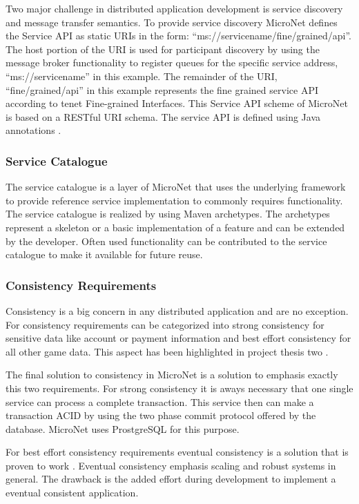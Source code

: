 Two major challenge in distributed application development is service discovery
and message transfer semantics. To provide service discovery MicroNet defines
the Service API as static URIs in the form:
``ms://servicename/fine/grained/api''. The host portion of the URI is used for
participant discovery by using the message broker functionality to register
queues for the specific service address, ``ms://servicename'' in this example.
The remainder of the URI, ``fine/grained/api'' in this example represents the
fine grained service API according to tenet Fine-grained Interfaces. This
Service API scheme of MicroNet is based on a RESTful URI schema. The service API
is defined using Java annotations .

\subsubsection{Service Catalogue}

The service catalogue is a layer of MicroNet that uses the underlying framework
to provide reference service implementation to commonly requires functionality.
The service catalogue is realized by using Maven archetypes. The archetypes
represent a skeleton or a basic implementation of a feature and can be extended
by the developer. Often used functionality can be contributed to the service
catalogue to make it available for future reuse.

\subsubsection{Consistency Requirements}

Consistency is a big concern in any distributed application and \ogs{} are no
exception. For \ogs{} consistency requirements can be categorized into strong
consistency for sensitive data like account or payment information and best
effort consistency for all other game data. This aspect has been highlighted in
project thesis two .

The final solution to consistency in MicroNet is a solution to emphasis
exactly this two requirements. For strong consistency it is aways necessary that
one single service can process a complete transaction. This service then can
make a transaction ACID by using the two phase commit protocol offered by the
database. MicroNet uses ProstgreSQL for this purpose.

For best effort consistency requirements eventual consistency is a solution that
is proven to work \cite{graham2016distributed_transactions}. Eventual
consistency emphasis scaling and robust systems in general. The drawback is the
added effort during development to implement a eventual consistent application.

